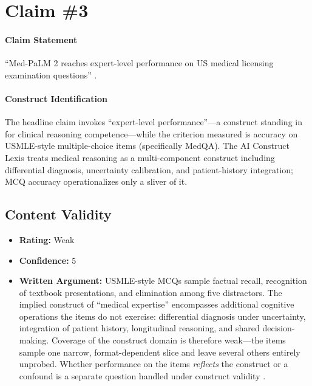 \section{Claim \#3}

\paragraph{Claim Statement} ``Med-PaLM 2 reaches expert-level performance on US medical licensing examination questions'' \citep{singhal2023medpalm2,singhal2025nature}.

\paragraph{Construct Identification} The headline claim invokes ``expert-level performance''---a construct standing in for clinical reasoning competence---while the criterion measured is accuracy on USMLE-style multiple-choice items (specifically MedQA). The AI Construct Lexis \citep{aiconstructlexis} treats medical reasoning as a multi-component construct including differential diagnosis, uncertainty calibration, and patient-history integration; MCQ accuracy operationalizes only a sliver of it.

\subsection{Content Validity}
\begin{itemize}
    \item \textbf{Rating:} Weak
    \item \textbf{Confidence:} 5
    \item \textbf{Written Argument:} USMLE-style MCQs sample factual recall, recognition of textbook presentations, and elimination among five distractors. The implied construct of ``medical expertise'' encompasses additional cognitive operations the items do not exercise: differential diagnosis under uncertainty, integration of patient history, longitudinal reasoning, and shared decision-making. Coverage of the construct domain is therefore weak---the items sample one narrow, format-dependent slice and leave several others entirely unprobed. Whether performance on the items \emph{reflects} the construct or a confound is a separate question handled under construct validity \citep{alaa2025medical,salaudeen2025measurement}.
\end{itemize}

